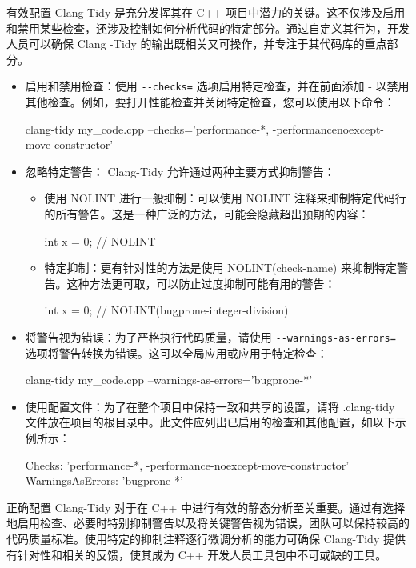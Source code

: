 
有效配置 Clang-Tidy 是充分发挥其在 C++ 项目中潜力的关键。这不仅涉及启用和禁用某些检查，还涉及控制如何分析代码的特定部分。通过自定义其行为，开发人员可以确保 Clang -Tidy 的输出既相关又可操作，并专注于其代码库的重点部分。

\begin{itemize}
\item
启用和禁用检查：使用 \verb|--checks=| 选项启用特定检查，并在前面添加 - 以禁用其他检查。例如，要打开性能检查并关闭特定检查，您可以使用以下命令：

\begin{shell}
clang-tidy my_code.cpp --checks='performance-*, -performancenoexcept-move-constructor'
\end{shell}

\item
忽略特定警告： Clang-Tidy 允许通过两种主要方式抑制警告：

\begin{itemize}
\item
使用 NOLINT 进行一般抑制：可以使用 NOLINT 注释来抑制特定代码行的所有警告。这是一种广泛的方法，可能会隐藏超出预期的内容：

\begin{cpp}
int x = 0; // NOLINT
\end{cpp}

\item
特定抑制：更有针对性的方法是使用 NOLINT(check-name) 来抑制特定警告。这种方法更可取，可以防止过度抑制可能有用的警告：

\begin{cpp}
int x = 0; // NOLINT(bugprone-integer-division)
\end{cpp}

\end{itemize}

\item
将警告视为错误：为了严格执行代码质量，请使用 \verb|--warnings-as-errors=| 选项将警告转换为错误。这可以全局应用或应用于特定检查：

\begin{shell}
clang-tidy my_code.cpp --warnings-as-errors='bugprone-*'
\end{shell}

\item
使用配置文件：为了在整个项目中保持一致和共享的设置，请将 .clang-tidy 文件放在项目的根目录中。此文件应列出已启用的检查和其他配置，如以下示例所示：

\begin{shell}
Checks: 'performance-*, -performance-noexcept-move-constructor' WarningsAsErrors: 'bugprone-*'
\end{shell}
\end{itemize}

正确配置 Clang-Tidy 对于在 C++ 中进行有效的静态分析至关重要。通过有选择地启用检查、必要时特别抑制警告以及将关键警告视为错误，团队可以保持较高的代码质量标准。使用特定的抑制注释逐行微调分析的能力可确保 Clang-Tidy 提供有针对性和相关的反馈，使其成为 C++ 开发人员工具包中不可或缺的工具。














